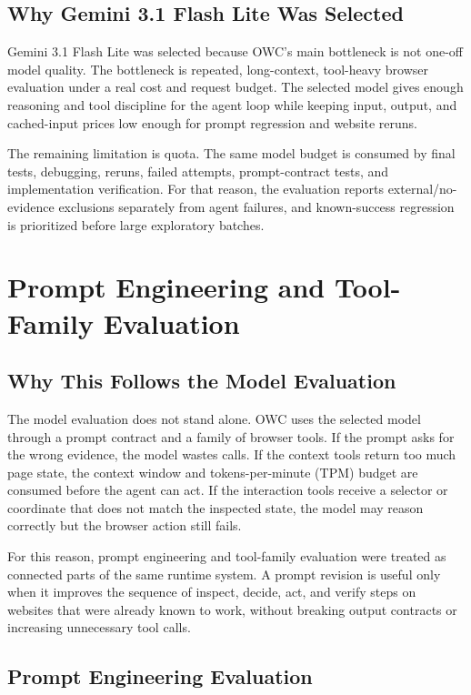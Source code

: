 \subsection{Why Gemini 3.1 Flash Lite Was Selected}

Gemini 3.1 Flash Lite was selected because OWC's main bottleneck is not one-off model
quality. The bottleneck is repeated, long-context, tool-heavy browser evaluation under a
real cost and request budget. The selected model gives enough reasoning and tool
discipline for the agent loop while keeping input, output, and cached-input prices low
enough for prompt regression and website reruns.

The remaining limitation is quota. The same model budget is consumed by final tests,
debugging, reruns, failed attempts, prompt-contract tests, and implementation
verification. For that reason, the evaluation reports external/no-evidence exclusions
separately from agent failures, and known-success regression is prioritized before large
exploratory batches.

\section{Prompt Engineering and Tool-Family Evaluation}

\subsection{Why This Follows the Model Evaluation}

The model evaluation does not stand alone. OWC uses the selected model through a prompt
contract and a family of browser tools. If the prompt asks for the wrong evidence, the
model wastes calls. If the context tools return too much page state, the context window
and tokens-per-minute (TPM) budget are consumed before the agent can act. If the
interaction tools receive a selector or coordinate that does not match the inspected
state, the model may reason correctly but the browser action still fails.

For this reason, prompt engineering and tool-family evaluation were treated as connected
parts of the same runtime system. A prompt revision is useful only when it improves the
sequence of inspect, decide, act, and verify steps on websites that were already known to
work, without breaking output contracts or increasing unnecessary tool calls.

\subsection{Prompt Engineering Evaluation}

